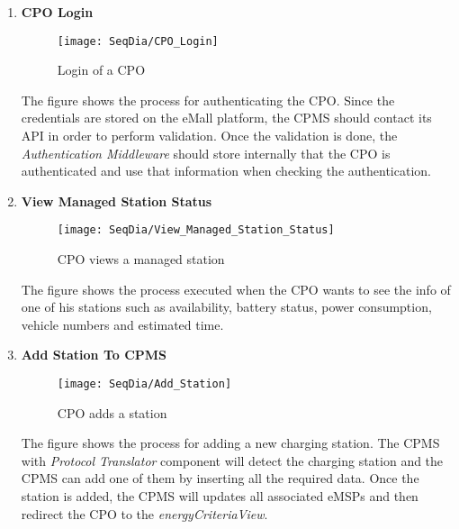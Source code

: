 \begin{enumerate}
        \newpage
        \item \textbf{CPO Login}
        \begin{figure}[H]
            \begin{center}
            \texttt{[image: SeqDia/CPO\_Login]}
            \caption{Login of a CPO}
            \label{fig:CPOLogin}
            \end{center}
        \end{figure}
        The figure shows the process for authenticating the CPO. Since the credentials are stored on the eMall platform, the CPMS should contact its API in order to perform validation. Once the validation is done, the \textit{Authentication Middleware} should store internally that the CPO is authenticated and use that information when checking the authentication. 
        \newpage
        \item \textbf{View Managed Station Status}
        \begin{figure}[H]
            \begin{center}
            \texttt{[image: SeqDia/View\_Managed\_Station\_Status]}
            \caption{CPO views a managed station}
            \label{fig:ManageStation}
            \end{center}
        \end{figure}
        The figure shows the process executed when the CPO wants to see the info of one of his stations such as availability, battery status, power consumption, vehicle numbers and estimated time.
        \newpage
        \item \textbf{Add Station To CPMS}
        \begin{figure}[H]
            \begin{center}
            \texttt{[image: SeqDia/Add\_Station]}
            \caption{CPO adds a station}
            \label{fig:AddStation}
            \end{center}
        \end{figure}
        The figure shows the process for adding a new charging station. The CPMS with \textit{Protocol Translator} component will detect the charging station and the CPMS can add one of them by inserting all the required data. Once the station is added, the CPMS will updates all associated eMSPs and then redirect the CPO to the \textit{energyCriteriaView}.

\end{enumerate}
